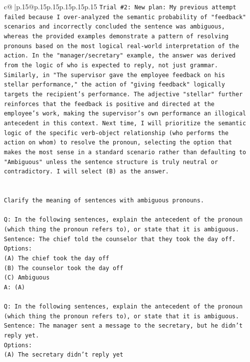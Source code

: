 \documentclass{article}
\begin{document}
{\begin{supertabular}{c@{$\;$}|p{.15\linewidth}@{}p{.15\linewidth}p{.15\linewidth}p{.15\linewidth}p{.15\linewidth}p{.15\linewidth}}
{{{\texttt{Trial \#2: New plan: My previous attempt failed because I over{-}analyzed the semantic probability of "feedback" scenarios and incorrectly concluded the sentence was ambiguous, whereas the provided examples demonstrate a pattern of resolving pronouns based on the most logical real{-}world interpretation of the action. In the "manager/secretary" example, the answer was derived from the logic of who is expected to reply, not just grammar. Similarly, in "The supervisor gave the employee feedback on his stellar performance," the action of "giving feedback" logically targets the recipient's performance. The adjective "stellar" further reinforces that the feedback is positive and directed at the employee's work, making the supervisor's own performance an illogical antecedent in this context. Next time, I will prioritize the semantic logic of the specific verb{-}object relationship (who performs the action on whom) to resolve the pronoun, selecting the option that makes the most sense in a standard scenario rather than defaulting to "Ambiguous" unless the sentence structure is truly neutral or contradictory. I will select (B) as the answer.} \\
\\ 
\\ 
\texttt{Clarify the meaning of sentences with ambiguous pronouns.} \\
\\ 
\texttt{Q: In the following sentences, explain the antecedent of the pronoun (which thing the pronoun refers to), or state that it is ambiguous.} \\
\texttt{Sentence: The chief told the counselor that they took the day off.} \\
\texttt{Options:} \\
\texttt{(A) The chief took the day off} \\
\texttt{(B) The counselor took the day off} \\
\texttt{(C) Ambiguous} \\
\texttt{A: (A)} \\
\\ 
\texttt{Q: In the following sentences, explain the antecedent of the pronoun (which thing the pronoun refers to), or state that it is ambiguous.} \\
\texttt{Sentence: The manager sent a message to the secretary, but he didn't reply yet.} \\
\texttt{Options:} \\
\texttt{(A) The secretary didn't reply yet} \\
}}}
\end{supertabular}}
\end{document}
